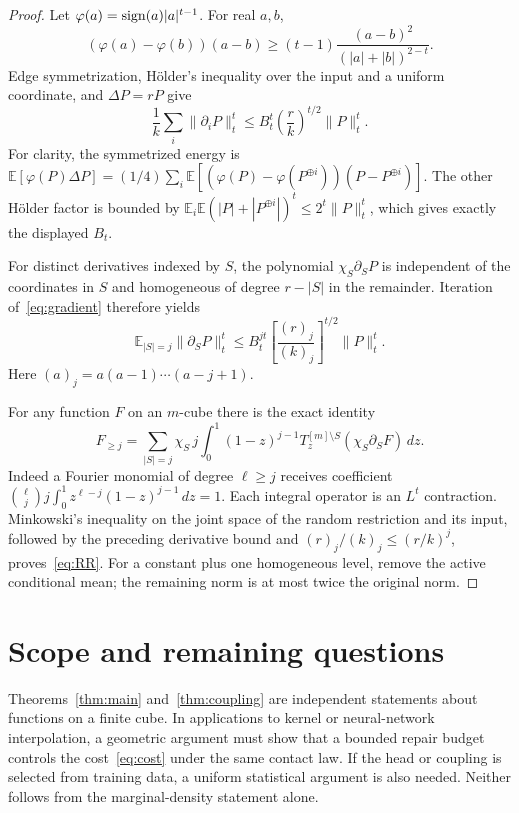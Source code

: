 \documentclass[11pt]{article}
\theoremstyle{remark}\newtheorem{remark}[theorem]{Remark}
\newcommand{\E}{\mathbb E}\newcommand{\Prb}{\mathbb P}
\newcommand{\1}{\mathbf 1}\newcommand{\norm}[2]{\lVert #1\rVert_{#2}}
\begin{document}
\begin{proof}
Let $\varphi(a)=\operatorname{sign}(a)|a|^{t-1}$. For real $a,b$,
\[
 (\varphi(a)-\varphi(b))(a-b)
 \ge(t-1)\frac{(a-b)^2}{(|a|+|b|)^{2-t}}.
\]
Edge symmetrization, H\"older's inequality over the input and a uniform coordinate, and $\Delta P=rP$ give
\begin{equation}\label{eq:gradient}
 \frac1k\sum_i\norm{\partial_iP}t^t
 \le B_t^t\left(\frac rk\right)^{t/2}\norm Pt^t.
\end{equation}
For clarity, the symmetrized energy is
$\E[\varphi(P)\Delta P]=(1/4)\sum_i\E[(\varphi(P)-\varphi(P^{\oplus i}))(P-P^{\oplus i})]$.
The other H\"older factor is bounded by
$\E_i\E(|P|+|P^{\oplus i}|)^t\le2^t\norm Pt^t$, which gives exactly the displayed $B_t$.

For distinct derivatives indexed by $S$, the polynomial $\chi_S\partial_SP$ is independent of the coordinates in $S$ and homogeneous of degree $r-|S|$ in the remainder. Iteration of~\eqref{eq:gradient} therefore yields
\[
 \E_{|S|=j}\norm{\partial_SP}t^t
 \le B_t^{jt}\left[\frac{(r)_j}{(k)_j}\right]^{t/2}\norm Pt^t.
\]
Here $(a)_j=a(a-1)\cdots(a-j+1)$.

For any function $F$ on an $m$-cube there is the exact identity
\[
 F_{\ge j}=\sum_{|S|=j}\chi_S\,j\int_0^1(1-z)^{j-1}
 T_z^{[m]\setminus S}(\chi_S\partial_SF)\,dz.
\]
Indeed a Fourier monomial of degree $\ell\ge j$ receives coefficient
$\binom\ell j j\int_0^1z^{\ell-j}(1-z)^{j-1}\,dz=1$.
Each integral operator is an $L^t$ contraction. Minkowski's inequality on the joint space of the random restriction and its input, followed by the preceding derivative bound and $(r)_j/(k)_j\le(r/k)^j$, proves~\eqref{eq:RR}.
For a constant plus one homogeneous level, remove the active conditional mean; the remaining norm is at most twice the original norm.
\end{proof}

\section{Scope and remaining questions}
Theorems~\ref{thm:main} and~\ref{thm:coupling} are independent statements about functions on a finite cube. In applications to kernel or neural-network interpolation, a geometric argument must show that a bounded repair budget controls the cost~\eqref{eq:cost} under the same contact law. If the head or coupling is selected from training data, a uniform statistical argument is also needed. Neither follows from the marginal-density statement alone.
\end{document}
